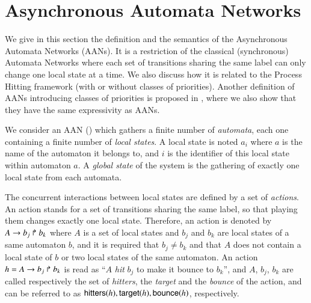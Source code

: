 \section{Asynchronous Automata Networks}
\label{sec:ph}

We give in this section the definition and the semantics of the Asynchronous Automata Networks (AANs).
It is a restriction of the classical (synchronous) Automata Networks
where each set of transitions sharing the same label
can only change one local state at a time.
We also discuss how it is related to the Process Hitting framework
(with or without classes of priorities).
Another definition of AANs introducing classes of priorities
is proposed in ,
where we also show that they have the same expressivity as AANs.

\medskip



We consider an AAN ()
which gathers a finite number of \emph{automata},
each one containing a finite number of \emph{local states}.
A local state is noted $a_i$ where $a$ is the name of the automaton it belongs to,
and $i$ is the identifier of this local state within automaton $a$.
A \emph{global state} of the system is the gathering
of exactly one local state from each automata.

The concurrent interactions between local states are defined by a set of \emph{actions}.
An action stands for a set of transitions sharing the same label,
so that playing them changes exactly one local state.
Therefore, an action is denoted by $A\rightarrow b_j\Rsh b_k$
where $A$ is a set of local states
and $b_j$ and $b_k$ are local states of a same automaton $b$,
and it is required that $b_j \neq b_k$ and that
$A$ does not contain a local state of $b$ or two local states of the same automaton.
An action $h=A\rightarrow b_j\Rsh b_k$ is read as
``$A$ \emph{hit} $b_j$ to make it bounce to $b_k$'',
and $A$, $b_j$, $b_k$ are called respectively the set of
\emph{hitters}, the \emph{target} and the \emph{bounce} of the action,
and can be referred to as $\mathsf{hitters}(h), \mathsf{target}(h), \mathsf{bounce}(h)$, respectively.

